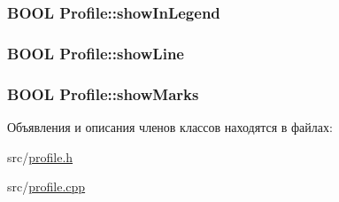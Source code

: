 \hypertarget{class_profile_a09c7baa3c0a3b1762f8c0eed5223868f}{
\subsubsection[{show\-In\-Legend}]{\setlength{\rightskip}{0pt plus 5cm}B\-O\-O\-L Profile\-::show\-In\-Legend\hspace{0.3cm}{\ttfamily [protected]}}}\label{class_profile_a09c7baa3c0a3b1762f8c0eed5223868f}
\hypertarget{class_profile_a7e12899117a7229fd74e727d4c7508aa}{
\subsubsection[{show\-Line}]{\setlength{\rightskip}{0pt plus 5cm}B\-O\-O\-L Profile\-::show\-Line\hspace{0.3cm}{\ttfamily [protected]}}}\label{class_profile_a7e12899117a7229fd74e727d4c7508aa}
\hypertarget{class_profile_a07364e07ee0c925c0b2a7631c666056b}{
\subsubsection[{show\-Marks}]{\setlength{\rightskip}{0pt plus 5cm}B\-O\-O\-L Profile\-::show\-Marks\hspace{0.3cm}{\ttfamily [protected]}}}\label{class_profile_a07364e07ee0c925c0b2a7631c666056b}


Объявления и описания членов классов находятся в файлах\-:\begin{DoxyCompactItemize}
\item 
src/\hyperlink{profile_8h}{profile.\-h}\item 
src/\hyperlink{profile_8cpp}{profile.\-cpp}\end{DoxyCompactItemize}
